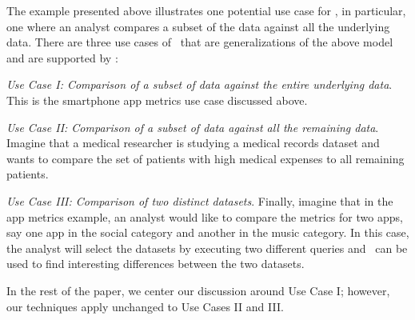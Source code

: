 The example presented above illustrates one potential use case for \VizRecDB,
in particular, one where an analyst compares a subset of the data against all
the underlying data.
There are three use cases of \VizRecDB\ that are generalizations of the above
model and are supported by \VizRecDB:
\begin{denselist}
  \item {\it Use Case I: Comparison of a subset of data against the entire
  underlying data}.
  This is the smartphone app metrics use case discussed above.
  \item {\it Use Case II: Comparison of a subset of data against all the
  remaining data}.
  Imagine that a medical researcher is studying a medical records dataset and
  wants to compare the set of patients with high medical expenses to all
  remaining patients. 
  \item {\it Use Case III: Comparison of two distinct datasets}. Finally,
  imagine that in the app metrics example, an analyst would like to compare
  the metrics for two apps, say one app in the social category and another in
  the music category. In this case, the analyst will select the datasets
  by executing two different queries and \VizRecDB\ can be used to find
  interesting differences between the two datasets.
\end{denselist}
In the rest of the paper, we center our discussion around Use Case I; however,
our techniques apply unchanged to Use Cases II and III.


